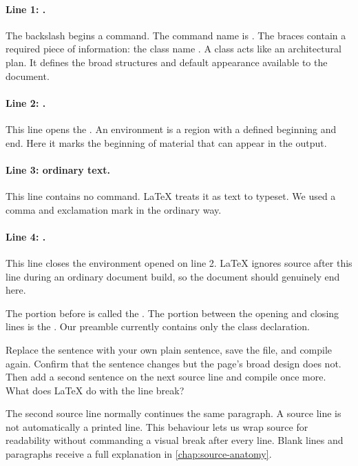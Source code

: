 \sourceanatomy

\paragraph{Line 1: .}
The backslash begins a command. The command name is
. The braces contain a required piece of information: the
class name . A class acts like an architectural plan. It defines
the broad structures and default appearance available to the document.

\paragraph{Line 2: .}
This line opens the  . An environment is a
region with a defined beginning and end. Here it marks the beginning of
material that can appear in the output.

\paragraph{Line 3: ordinary text.}
This line contains no command. \LaTeX{} treats it as text to typeset. We used a
comma and exclamation mark in the ordinary way.

\paragraph{Line 4: .}
This line closes the environment opened on line 2. \LaTeX{} ignores source after
this line during an ordinary document build, so the document should genuinely
end here.

The portion before  is called the
. The portion between the opening and closing lines is the
. Our preamble currently contains only the class
declaration.

\begin{tryit}
Replace the sentence with your own plain sentence, save the file, and compile
again. Confirm that the sentence changes but the page's broad design does not.
Then add a second sentence on the next source line and compile once more. What
does \LaTeX{} do with the line break?
\end{tryit}

The second source line normally continues the same paragraph. A source line is
not automatically a printed line. This behaviour lets us wrap source for
readability without commanding a visual break after every line. Blank lines
and paragraphs receive a full explanation in \cref{chap:source-anatomy}.


